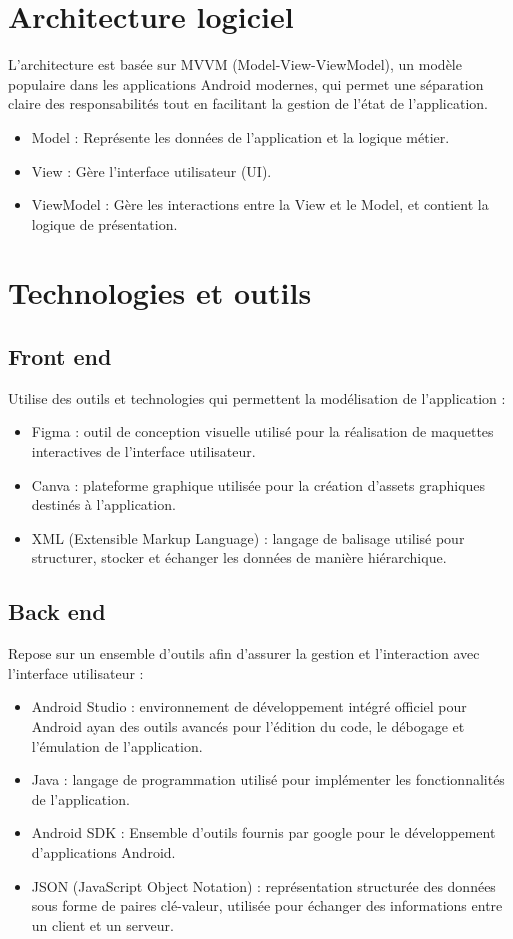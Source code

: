 \documentclass{conception_detaillee}
\begin{document}
\begin{itemize}[label=\textbullet]
\section{Architecture logiciel}
L'architecture est basée sur MVVM (Model-View-ViewModel), un modèle populaire dans les applications Android modernes, qui permet une séparation claire des responsabilités tout en facilitant la gestion de l'état de l'application.
\begin{itemize}[label=\textbullet]
\item Model : Représente les données de l'application et la logique métier.
\item View : Gère l'interface utilisateur (UI).
\item ViewModel : Gère les interactions entre la View et le Model, et contient la logique de présentation.
\end{itemize}
\section{Technologies et outils}
\subsection{Front end}
Utilise des outils et
technologies qui permettent la modélisation de l’application :
\begin{itemize}[label=\textbullet]
\item Figma : outil de conception visuelle utilisé pour la
réalisation de maquettes interactives de l’interface
utilisateur.
\item Canva : plateforme graphique utilisée pour la création d’assets graphiques destinés à l’application.
\item XML (Extensible Markup Language) : langage de balisage utilisé pour structurer, stocker et échanger les données de manière hiérarchique.
\end{itemize}
\subsection{Back end}
Repose sur un ensemble
d’outils afin d’assurer la gestion et l’interaction avec
l’interface utilisateur :
\begin{itemize}[label=\textbullet]
\item Android Studio : environnement de développement
intégré officiel pour Android ayan des outils avancés
pour l’édition du code, le débogage et l’émulation
de l’application.
\item Java : langage de programmation utilisé pour
implémenter les fonctionnalités de l’application.
\item Android SDK : Ensemble d’outils fournis par google
pour le développement d’applications Android.
\item JSON (JavaScript Object Notation) : représentation
structurée des données sous forme de paires clé-valeur, utilisée pour échanger des informations
entre un client et un serveur.
\end{itemize}

\end{itemize}
\end{document}
